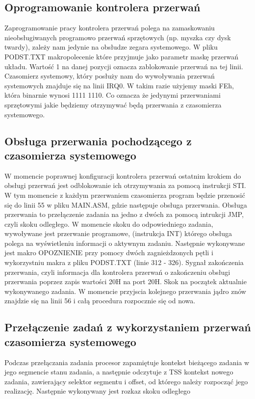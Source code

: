 \documentclass[a4paper,12pt]{article}
\begin{document}
		\subsection{Oprogramowanie kontrolera przerwań}
Zaprogramowanie pracy kontrolera przerwań polega na zamaskowaniu nieobsługiwanych programowo przerwań sprzętowych (np. myszka czy dysk twardy), zależy nam jedynie na obsłudze zegara systemowego. W pliku PODST.TXT makropolecenie które przyjmuje jako parametr maskę przerwań układu. Wartość 1 na danej pozycji oznacza zablokowanie przerwań na tej linii. Czasomierz systemowy, który posłuży nam do wywoływania przerwań systemowych znajduje się na linii IRQ0. W takim razie użyjemy maski FEh, która binarnie wynosi 1111 1110. Co oznacza że jedynymi przerwaniami sprzętowymi jakie będziemy otrzymywać będą przerwania z czasomierza systemowego.

\subsection{Obsługa przerwania pochodzącego z czasomierza systemowego}
W momencie poprawnej konfiguracji kontrolera przerwań ostatnim krokiem do obsługi przerwań jest odblokowanie ich otrzymywania za pomocą instrukcji STI. W tym momencie z każdym przerwaniem czasomierza program będzie przenosić się do linii 55 w pliku MAIN.ASM, gdzie następuje obsługa przerwania.
Obsługa przerwania to przełączenie zadania na jedno z dwóch za pomocą intrukcji JMP, czyli skoku odległego. W momencie skoku do odpowiedniego zadania, wywoływane jest przerwanie programowe, (instrukcja INT) którego obsługa polega na wyświetleniu informacji o aktywnym zadaniu. 
Następnie wykonywane jest makro OPOZNIENIE przy pomocy dwóch zagnieżdzonych pętli i wykorzystniu makra z pliku PODST.TXT (linie 312 - 326). Sygnał zakończenia przerwania, czyli informacja dla kontrolera przerwań o zakończeniu obsługi przerwania poprzez zapis wartości 20H na port 20H. Skok na początek aktualnie wykonywanego zadania. W momencie przyjscia kolejnego przerwania jądro znów znajdzie się na linii 56 i całą procedura rozpocznie się od nowa. 

\subsection{Przełączenie zadań z wykorzystaniem przerwań czasomierza systemowego}

Podczas przełączania zadania procesor zapamiętuje kontekst bieżącego zadania w jego segmencie stanu zadania, a następnie odczytuje z TSS kontekst nowego zadania, zawierający selektor segmentu i offset, od którego należy rozpocząć jego realizację.  Następnie wykonywany jest rozkaz skoku odległego 
\end{document}
